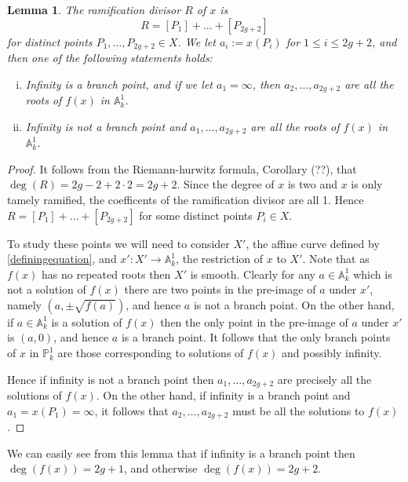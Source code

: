 \documentclass[11pt]{article} %
\theoremstyle{plain}
\newtheorem{lem}[defn]{Lemma}
\theoremstyle{remark}
\begin{document}
\begin{lem}
The ramification divisor $R$ of $x$ is
\begin{equation*}
R = [P_1] + \ldots + [P_{2g+2}]
\end{equation*}
for distinct points $P_1, \ldots , P_{2g+2} \in X$.
We let $a_i := x(P_i)$ for $1\leq i \leq 2g+2$, and then one of the following statements holds:
\begin{enumerate}[(i)]
	\item Infinity is a branch point, and if we let $a_1 = \infty$, then $a_2,\ldots ,a_{2g+2}$ are all the roots of $f(x)$ in $\mathbb A_k^1$.
	\item Infinity is not a branch point and $a_1, \ldots , a_{2g+2}$ are all the roots of $f(x)$ in $\mathbb A_k^1$.
\end{enumerate}
\end{lem}
\begin{proof}
It follows from the Riemann-hurwitz formula, Corollary (??), that $\deg(R) = 2g - 2 +2\cdot2 = 2g+2$.
Since the degree of $x$ is two and $x$ is only tamely ramified, the coefficents of the ramification divisor are all 1.
Hence $R= [P_1] + \ldots + [P_{2g+2}]$ for some distinct points $P_i \in X$.


To study these points we will need to consider $X'$, the affine curve defined by \eqref{definingequation}, and $x':X'\rightarrow \mathbb A_k^1$, the restriction of $x$ to $X'$.
Note that as $f(x)$ has no repeated roots then $X'$ is smooth.
Clearly for any $a\in \mathbb A_k^1$ which is not a solution of $f(x)$ there are two points in the pre-image of $a$ under $x'$, namely $(a, \pm \sqrt {f(a)})$, and hence $a$ is not a branch point.
On the other hand, if $a \in \mathbb A_k^1$ is a solution of $f(x)$ then the only point in the pre-image of $a$ under $x'$ is $(a,0)$, and hence $a$ is a branch point.
It follows that the only branch points of $x$ in $\mathbb P_k^1$ are those corresponding to solutions of $f(x)$ and possibly infinity.

Hence if infinity is not a branch point then $a_1, \ldots , a_{2g+2}$ are precisely all the solutions of $f(x)$. 
On the other hand, if infinity is a branch point and $a_1=x(P_1)=\infty$, it follows that $a_2,\ldots ,a_{2g+2}$ must be all the solutions to $f(x)$.
\end{proof}

We can easily see from this lemma that if infinity is a branch point then $\deg(f(x)) = 2g+1$, and otherwise $\deg(f(x)) = 2g+2$.
\end{document}
